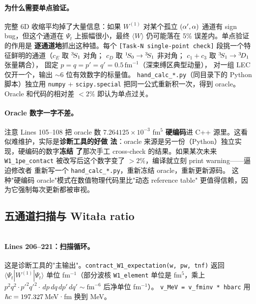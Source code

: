 \paragraph{为什么需要单点验证。}
完整 6D 收缩平均掉了大量信息：如果 \(W^{(1)}\) 对某个孤立 \((\alpha', \alpha)\)
通道有 sign bug，但这个通道在 \(\Psi_t\) 上振幅很小，最终
\(\langle W\rangle\) 仍可能落在 5\% 误差内。单点验证的作用是
\textbf{逐通道地}抓出这种错。每个 \texttt{[Task-N single-point check]}
段挑一个特征鲜明的通道（\(c_E\) 取 \({}^{3}\!S_{1}\) 对角；
\(c_D\) 取 \({}^{1}\!S_{0} \to {}^{3}\!S_{1}\) 非对角；
\(c_1+c_3\) 取 \({}^{3}\!S_{1} \to {}^{3}\!D_{1}\) 张量耦合），
固定 \(p = q = p' = q' = 0.5\,\mathrm{fm}^{-1}\)（深束缚区典型动量），
对一组 LEC 仅开一个，输出 \(\sim 6\) 位有效数字的标量值。
\texttt{hand\_calc\_*.py}（同目录下的 Python 脚本）独立用 \texttt{numpy}
+ \texttt{scipy.special} 把同一公式重新积一次，得到 oracle。Oracle
和代码的相对差 \(<2\%\) 即认为单点过关。

\paragraph{Oracle 数字一字不差。}
注意 Lines 105--108 把 oracle 数 \(7.264125 \times 10^{-3}\) fm\(^5\)
\textbf{硬编码}进 C++ 源里。这看似难维护，实际是\textbf{诊断工具的好做
法}：oracle 来源是另一份（Python）独立实现，硬编码的数字\textbf{冻结
了}那次手工 cross-check 的结果。如果某次未来 \texttt{W1\_1pe\_contact}
被改写后这个数字变了 \(>2\%\)，编译就立刻 print warning——逼迫修改者
重新写一个 \texttt{hand\_calc\_*.py}，重新冻结 oracle，重新更新源码。
这种"硬编码 oracle"模式在数值物理代码里比"动态 reference table"
更值得信赖，因为它强制每次更新都被审视。

\subsection{五通道扫描与 Witała ratio}
\label{subsec:ch17-code-lec-sweep}

\begin{lstlisting}[style=cpp, caption={LEC 扫描、加性检查与 Epelbaum/Witała 比对 (lines 206--260)}, label={lst:ch17-lec-sweep}]
\end{lstlisting}


\paragraph{Lines 206--221：扫描循环。}
这是诊断工具的"主输出"。\texttt{contract\_W1\_expectation(w, pw, tnf)}
返回 \(\langle\Psi_t|W^{(1)}|\Psi_t\rangle\) 单位 fm\(^{-1}\)（部分波核
\texttt{W1\_element} 单位是 fm\(^5\)，乘上 \(p^2 q^2 \cdot p'^2 q'^2 \cdot
\,dp\,dq\,dp'\,dq' \sim \mathrm{fm}^{-6}\) 后净单位 fm\(^{-1}\)）。
\texttt{v\_MeV = v\_fminv * hbarc} 用 \(\hbar c = 197.327\)\,MeV·fm 换到 MeV。

